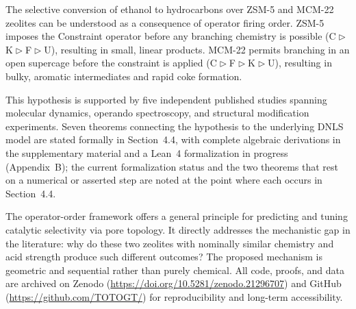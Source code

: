 \documentclass[11pt]{article}
\newcommand{\comp}{\mathrel{\triangleright}} %
\begin{document}
The selective conversion of ethanol to hydrocarbons over ZSM-5 and MCM-22 zeolites can be understood as a consequence of operator firing order. ZSM-5 imposes the Constraint operator before any branching chemistry is possible (C$\comp$K$\comp$F$\comp$U), resulting in small, linear products. MCM-22 permits branching in an open supercage before the constraint is applied (C$\comp$F$\comp$K$\comp$U), resulting in bulky, aromatic intermediates and rapid coke formation.

This hypothesis is supported by five independent published studies spanning molecular dynamics, operando spectroscopy, and structural modification experiments. Seven theorems connecting the hypothesis to the underlying DNLS model are stated formally in Section~4.4, with complete algebraic derivations in the supplementary material and a Lean~4 formalization in progress (Appendix~B); the current formalization status and the two theorems that rest on a numerical or asserted step are noted at the point where each occurs in Section~4.4.

The operator-order framework offers a general principle for predicting and tuning catalytic selectivity via pore topology. It directly addresses the mechanistic gap in the literature: why do these two zeolites with nominally similar chemistry and acid strength produce such different outcomes? The proposed mechanism is geometric and sequential rather than purely chemical. All code, proofs, and data are archived on Zenodo (\url{https://doi.org/10.5281/zenodo.21296707}) and GitHub (\url{https://github.com/TOTOGT/}) for reproducibility and long-term accessibility.
\end{document}
